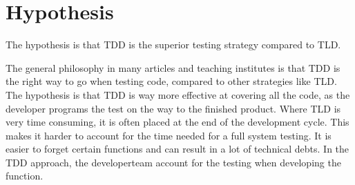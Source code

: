 \section{Hypothesis}
\label{section:hypothesis}

The hypothesis is 
that TDD is the superior testing strategy compared to TLD.\newline

 
The general philosophy in many articles and teaching institutes is that TDD is the right way to go when testing code, 
compared to other strategies like TLD. The hypothesis is that TDD is way more effective at covering all the code, 
as the developer programs the test on the way to the finished product.  
Where TLD is very time consuming, it is often placed at the end of the development cycle. 
This makes it harder to account for the time needed for a full system testing. 
It is easier to forget certain functions and can result in a lot of technical debts. 
In the TDD approach, the developerteam account for the testing when developing the function.
